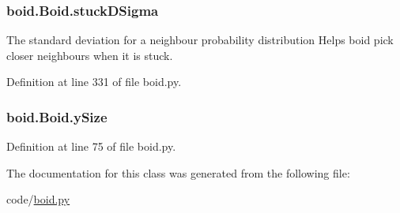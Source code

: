 \hypertarget{classboid_1_1Boid_a03960faefd59c4a651442eb373aa5c15}{
\subsubsection[{stuck\-D\-Sigma}]{\setlength{\rightskip}{0pt plus 5cm}boid.\-Boid.\-stuck\-D\-Sigma}}\label{classboid_1_1Boid_a03960faefd59c4a651442eb373aa5c15}


The standard deviation for a neighbour probability distribution Helps boid pick closer neighbours when it is stuck. 



Definition at line 331 of file boid.\-py.

\hypertarget{classboid_1_1Boid_a09f8fe6b2deb64fd65cfd64fc01470b9}{
\subsubsection[{y\-Size}]{\setlength{\rightskip}{0pt plus 5cm}boid.\-Boid.\-y\-Size}}\label{classboid_1_1Boid_a09f8fe6b2deb64fd65cfd64fc01470b9}


Definition at line 75 of file boid.\-py.



The documentation for this class was generated from the following file\-:\begin{DoxyCompactItemize}
\item 
code/\hyperlink{boid_8py}{boid.\-py}\end{DoxyCompactItemize}
